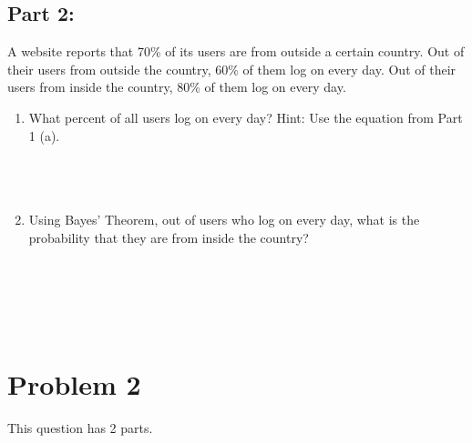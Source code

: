 \documentclass{amsart}
\theoremstyle{definition}
\theoremstyle{Exercise}
\theoremstyle{remark}
\theoremstyle{rule}
\numberwithin{equation}{section}
\begin{document}
 \subsection*{Part 2:}
 A website reports that 70\% of its users are from outside a certain country. Out of their users from outside the country, 60\% of them log on every day. Out of their users from inside the country, 80\% of them log on every day.
 \\
 \begin{enumerate}[label=(\alph*)]
 \item What percent of all users log on every day? Hint: Use the equation from Part 1 (a).
 \\\\
 \\\\
 \item Using Bayes’ Theorem, out of users who log on every day, what is the probability that they are from inside the country?
 \\\\
 \\\\
 \end{enumerate}
\newpage

~\\
  \section*{Problem 2}
 \noindent
 This question has 2 parts.
\end{document}
